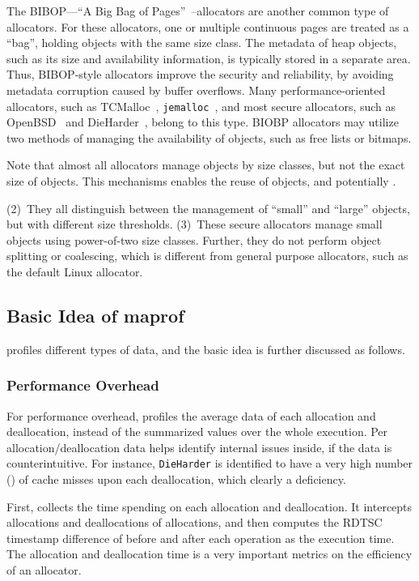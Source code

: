 The BIBOP---``A Big Bag of Pages''~\cite{hanson1980}--allocators are another common type of allocators. For these allocators, one or multiple continuous pages are treated as a ``bag'', holding objects with the same size class. The metadata of heap objects, such as its size and availability information, is typically stored in a separate area. Thus, BIBOP-style allocators improve the security and reliability, by avoiding metadata corruption caused by buffer overflows. Many performance-oriented allocators, such as TCMalloc~\cite{TCMalloc}, \texttt{jemalloc}~\cite{jemalloc}, and most secure allocators, such as OpenBSD~\cite{OpenBSD} and DieHarder~\cite{DieHarder}, belong to this type. BIOBP allocators may utilize two methods of managing the availability of objects, such as free lists or bitmaps. 


Note that almost all allocators manage objects by  size classes, but not the exact size of objects. This mechanisms enables the reuse of objects, and potentially .   


(2)~They all distinguish between the management of ``small'' and ``large'' objects, but with different size thresholds. (3)~These secure allocators manage small objects using power-of-two size classes. Further, they do not perform object splitting or coalescing, which is different from general purpose allocators, such as the default Linux allocator.



\subsection{Basic Idea of maprof}
\MP{} profiles different types of data, and the basic idea is further discussed as follows. 
  
\subsubsection{Performance Overhead}

For performance overhead, \MP{} profiles the average data of each allocation and deallocation, instead of the summarized values over the whole execution. Per allocation/deallocation data helps identify internal issues inside, if the data is counterintuitive. For instance, \texttt{DieHarder} is identified to have a very high number () of cache misses upon each deallocation, which clearly a deficiency. 

First, \MP{} collects the time spending on each allocation and deallocation. It intercepts allocations and deallocations of allocations, and then computes the RDTSC timestamp difference of before and after each operation as the execution time. The allocation and deallocation time is a very important metrics on the efficiency of an allocator.  

